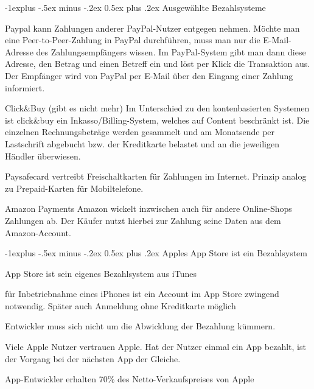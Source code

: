 \documentclass[a4paper]{article}
\makeatletter
\renewcommand{\subsection}{\@startsection{subsection}{2}{0mm}%
                                {-1explus -.5ex minus -.2ex}%
                                {0.5ex plus .2ex}%
                                {\normalfont\normalsize\bfseries}}
\makeatother
\begin{document}
\begin{multicols*}{2}
  \subsection{Ausgewählte Bezahlsysteme}
  \begin{description*}
    \item[Paypal] kann Zahlungen anderer PayPal-Nutzer entgegen nehmen. Möchte man eine  Peer-to-Peer-Zahlung in PayPal durchführen, muss man nur die E-Mail-Adresse des Zahlungsempfängers wissen. Im PayPal-System gibt man dann diese Adresse, den Betrag und einen Betreff ein und löst per Klick die Transaktion aus. Der Empfänger wird von PayPal per E-Mail über den Eingang einer Zahlung informiert.
    \item[Click\&Buy] (gibt es nicht mehr) Im Unterschied zu den kontenbasierten Systemen ist click\&buy ein Inkasso/Billing-System, welches auf Content beschränkt ist. Die einzelnen Rechnungsbeträge werden gesammelt und am Monatsende per Lastschrift abgebucht bzw. der Kreditkarte belastet und an die jeweiligen Händler überwiesen.
    \item[Paysafecard] vertreibt Freischaltkarten für Zahlungen im Internet. Prinzip analog zu Prepaid-Karten für Mobiltelefone.
    \item[Amazon Payments] Amazon wickelt inzwischen auch für andere Online-Shops Zahlungen ab. Der Käufer nutzt hierbei zur Zahlung seine Daten aus dem Amazon-Account.
  \end{description*}

  \columnbreak
  \subsection{Apples App Store ist ein Bezahlsystem}
  \begin{itemize*}
    \item App Store ist sein eigenes Bezahlsystem aus iTunes
    \item für Inbetriebnahme eines iPhones ist ein Account im App Store zwingend notwendig. Später auch Anmeldung ohne Kreditkarte möglich
    \item Entwickler muss sich nicht um die Abwicklung der Bezahlung kümmern.
    \item Viele Apple Nutzer vertrauen Apple. Hat der Nutzer einmal ein App bezahlt, ist der Vorgang bei der nächsten App der Gleiche.
    \item App-Entwickler erhalten 70\% des Netto-Verkaufspreises von Apple
  \end{itemize*}


\end{multicols*}
\end{document}
